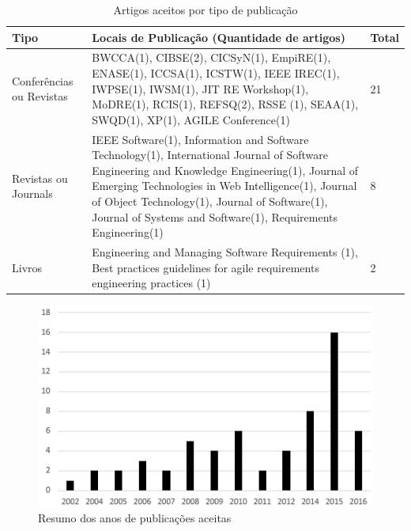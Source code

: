 \begin{table}[!t]
\renewcommand{\arraystretch}{1.1}
\caption{Artigos aceitos por tipo de publicação}
\label{table:artigos_por_publicacao}
\centering
\begin{tabular}{|m{1.2cm}|m{5.5cm}|m{0.4cm}|}
\hline
Tipo & Locais de Publicação (Quantidade de artigos) & Total  \\ 
\hline\hline
Conferências ou Revistas & BWCCA(1), CIBSE(2), CICSyN(1), EmpiRE(1), ENASE(1), ICCSA(1), ICSTW(1), IEEE IREC(1), IWPSE(1), IWSM(1), JIT RE Workshop(1), MoDRE(1), RCIS(1), REFSQ(2), RSSE (1), SEAA(1), SWQD(1), XP(1), AGILE Conference(1) & 21 \\
\hline
Revistas ou Journals & IEEE Software(1), Information and Software Technology(1), International Journal of Software Engineering and Knowledge Engineering(1), Journal of Emerging Technologies in Web Intelligence(1), Journal of Object Technology(1), Journal of Software(1), Journal of Systems and Software(1), Requirements Engineering(1) & 8 \\
\hline
Livros & Engineering and Managing Software Requirements (1), Best practices guidelines for agile requirements engineering practices (1) & 2 \\
\hline
\end{tabular}
\end{table}

\begin{figure}[!t]
\captionsetup{justification=centering}
\centering
\includegraphics[scale=0.6]{images/Aceitos_ano}
\caption{Resumo dos anos de publicações aceitas}
\label{fig:aceitos_ano}
\end{figure}

